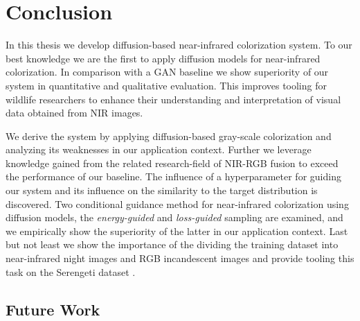 \chapter{Conclusion}
In this thesis we develop diffusion-based near-infrared colorization system. 
To our best knowledge we are the first to apply diffusion models for near-infrared colorization.
In comparison with a GAN baseline \parencite{mehri} we show superiority of our system in quantitative and qualitative evaluation.
This improves tooling for wildlife researchers to enhance their understanding and interpretation of visual data obtained from NIR images.

We derive the system by applying diffusion-based gray-scale colorization \parencite{sbgm} and analyzing its weaknesses in our application context.
Further we leverage knowledge gained from the related research-field of NIR-RGB fusion \parencite{study-vis-nir-fusion} to exceed the performance of our baseline.
The influence of a hyperparameter for guiding our system and its influence on the similarity to the target distribution is discovered.
Two conditional guidance method for near-infrared colorization using diffusion models, the \textit{energy-guided} and \textit{loss-guided} sampling 
are examined, and we empirically show the superiority of the latter in our application context.
Last but not least we show the importance of the dividing the training dataset into near-infrared night images and RGB incandescent images
and provide tooling this task on the Serengeti dataset \parencite{serengeti}.


\section{Future Work} 
\label{sec:future-work}